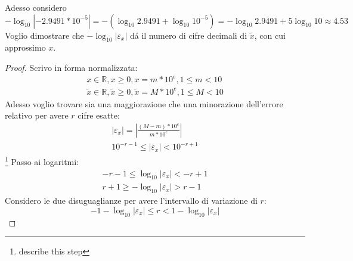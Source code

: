 Adesso considero
\begin{equation*}
	-\log_{10}{|-2.9491*10^{-5}|} = -\left (\log_{10}{2.9491} +
	\log_{10}{10^{-5}} \right ) = -\log_{10}{2.9491} + 5\log_{10}{10} \approx 4.53
\end{equation*}
Voglio dimostrare che $-\log_{10}{|\varepsilon_{x}|}$ d\'a il numero di cifre 
decimali di $\tilde{x}$, con cui approssimo $x$. 
\begin{proof}
Scrivo in forma normalizzata:
\begin{equation*}
	\begin{split}
		x \in \mathbb{R}, x \geq 0, x = m*10^{e}, 1 \leq m < 10 \\
		\tilde{x} \in \mathbb{R}, \tilde{x} \geq 0, \tilde{x} = M*10^{e}, 1 \leq M
		< 10
	\end{split}
\end{equation*}
Adesso voglio trovare sia una maggiorazione che una minorazione dell'errore 
relativo per avere $r$ cifre esatte:
\begin{equation*}
	\begin{split}
		\left | \varepsilon_{x} \right | = \left | \frac{(M - m) * 10^{e}} {m*10^{e}}
		\right | \\
		10^{-r-1} \leq |\varepsilon_{x}| < 10^{-r+1}
	\end{split}
\end{equation*}\footnote{describe this step}
Passo ai logaritmi:
\begin{equation*}
	\begin{split}
		-r-1 \leq  \log_{10}{|\varepsilon_{x}|} < -r+1 \\
		r+1 \geq -\log_{10}{|\varepsilon_{x}|} > r-1
	\end{split}
\end{equation*}
Considero le due disuguaglianze per avere l'intervallo di variazione di $r$:
\begin{equation*}
	-1 - \log_{10}{|\varepsilon_{x}|} \leq r < 1 - \log_{10}{|\varepsilon_{x}|}
\end{equation*}
\end{proof}

